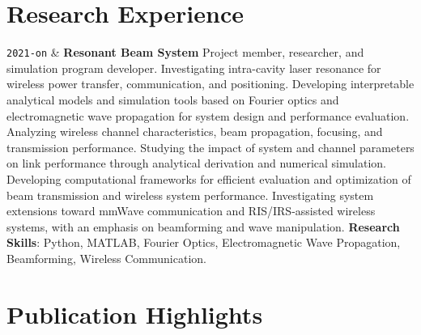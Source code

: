 \documentclass[9pt,a4paper]{article}
\newcommand{\Duration}[2]{\fontsize{10pt}{0}\selectfont \texttt{#1-#2}}
\newcommand{\Ongoing}{on}
\begin{document}
\section{Research Experience}

\begin{EntriesTableDuration}
  \Duration{2021}{\Ongoing} &
\textbf{Resonant Beam System}
\hfill Project member, researcher, and simulation program developer.
\newline
Investigating intra-cavity laser resonance for wireless power transfer, communication, and positioning.
\newline Developing interpretable analytical models and simulation tools based on Fourier optics and electromagnetic wave propagation for system design and performance evaluation.
\newline Analyzing wireless channel characteristics, beam propagation, focusing, and transmission performance.
\newline Studying the impact of system and channel parameters on link performance through analytical derivation and numerical simulation.
\newline Developing computational frameworks for efficient evaluation and optimization of beam transmission and wireless system performance.
\newline Investigating system extensions toward mmWave communication and RIS/IRS-assisted wireless systems, with an emphasis on beamforming and wave manipulation.
\newline \textbf{Research Skills}: Python, MATLAB, Fourier Optics, Electromagnetic Wave Propagation, Beamforming, Wireless Communication.
\\

\end{EntriesTableDuration}



\section{Publication Highlights}
\end{document}
